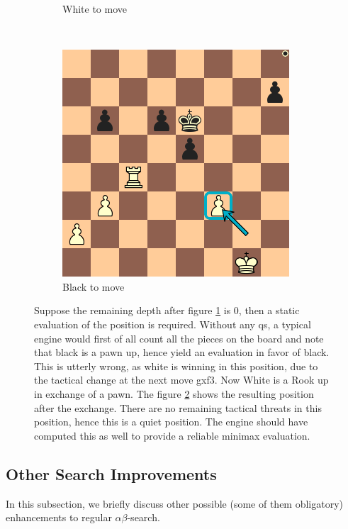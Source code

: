 \begin{figure}
\begin{subfigure}[b]{0.3\textwidth}
        \caption{White to move}
        \label{fig:qs2}
    \end{subfigure}
    ~ %
    \begin{subfigure}[b]{0.3\textwidth}
        \includegraphics[width=\textwidth]{fig/diagram_qs_3}
        \caption{Black to move}
        \label{fig:qs3}
    \end{subfigure}
    \caption[Importance quiescence search]{Suppose the remaining depth after figure \ref{fig:qs2} is 0, then a static evaluation of the position is required. Without any \gls{qs}, a typical engine would first of all count all the pieces on the board and note that black is a pawn up, hence yield an evaluation in favor of black. This is utterly wrong, as white is winning in this position, due to the tactical change at the next move gxf3. Now White is a Rook up in exchange of a pawn. The figure \ref{fig:qs3} shows the resulting position after the exchange. There are no remaining tactical threats in this position, hence this is a quiet position. The engine should have computed this as well to provide a reliable minimax evaluation.}
    \label{fig:qs}
\end{figure}

\subsection{Other Search Improvements}
\label{subsec:others}
In this subsection, we briefly discuss other possible (some of them obligatory) enhancements to regular $\alpha \beta$-search. \\

